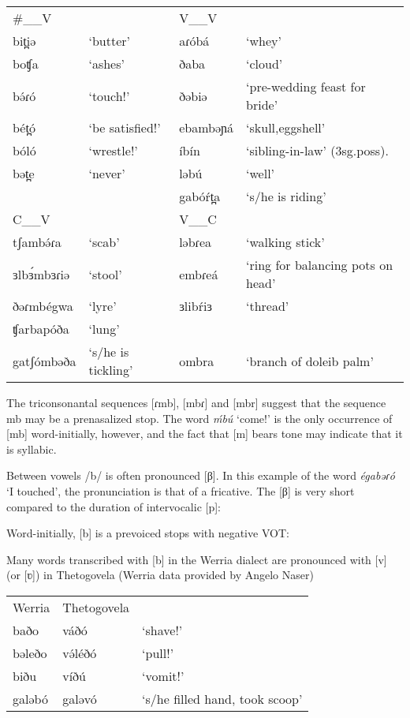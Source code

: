 \ea	
\begin{supertabular}[t]{p{2cm}lll}
\#\_\_V	&	&				V\_\_V	\\
bit̪iə	&	‘butter’		&aɾóbá		&‘whey’\\
boʧa	&	‘ashes’		&ðaba		&‘cloud’\\
bə́ɾó		&	‘touch!’		&ðəbiə		&‘pre-wedding feast for bride’\\
bét̪ó	&	‘be satisfied!’&	ebambəɲá	&‘skull,eggshell’\\

bóló	&	‘wrestle!’		&íbín		&‘sibling-in-law’ (3sg.poss).\\
bət̪e	&	‘never’		&ləbú		&‘well’\\
		&					&gabóŕt̪a	&‘s/he is riding’		\\
\midrule
C\_\_V	&	&	V\_\_C	\\
\midrule
tʃambə́ɾa		&‘scab’			&ləbɾea		&‘walking stick’\\
ɜlbɜ́mbɜɾiə	&‘stool’		&embɾeá		&‘ring for balancing pots on head’\\
ðəɾmbégwa	&	‘lyre’		&ɜlibŕiɜ	&‘thread’\\
ʧarbapóða	&‘lung’		\\
gatʃómbəða	&	‘s/he is tickling’	&ombra	&‘branch of doleib palm’\\
\end{supertabular}\label{ex:ch2:14}
\z 

The triconsonantal sequences [ɾmb], [mbɾ] and [mbr] suggest that the sequence mb may be a prenasalized stop. The word \textit{ḿbú} ‘come!’ is the only occurrence of [mb] word-initially, however, and the fact that [m] bears tone may indicate that it is syllabic. 
			
Between vowels /b/ is often pronounced [β]. In this example of the word \textit{égabəɾó} ‘I touched’, the pronunciation is that of a fricative. The [β] is very short compared to the duration of intervocalic [p]:


Word-initially, [b] is a prevoiced stops with negative VOT: %

Many words transcribed with [b] in the Werria dialect are pronounced with [v] (or [ʋ]) in Thetogovela (Werria data provided by Angelo Naser)

\ea	
\begin{tabular}[t]{lll}
	Werria	&	Thetogovela \\
	baðo	&		váðó		&	‘shave!’\\
	bəleðo	&		və́léðó	&	‘pull!’\\
	biðu	&		víðú		&	‘vomit!’\\
	galəbó	&		galəvó	&	‘s/he filled hand, took scoop’
\end{tabular}\label{ex:ch2:15}
\z 

